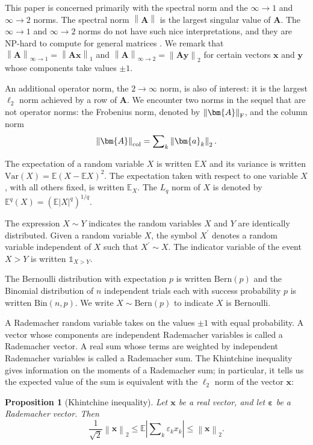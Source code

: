 \documentclass[11pt,letterpaper,twoside,reqno]{amsart}
\newcommand{\mat}[1]{\ensuremath{\bm{#1}}}
\newcommand{\E}{\ensuremath{\mathbb{E}}}
\newcommand{\norm}[1]{\ensuremath{\left\|#1\right\|}}
\newcommand{\infonorm}[1]{\ensuremath{\left\|#1\right\|_{\infty\rightarrow 1}}}
\newcommand{\inftnorm}[1]{\ensuremath{\left\|#1\right\|_{\infty\rightarrow 2}}}
\newcommand{\infone}{\ensuremath{\infty\!\rightarrow\!\!1}}
\newcommand{\inftwo}{\ensuremath{\infty\!\rightarrow\!\!2}}
\newcommand{\twoinf}{\ensuremath{2\!\!\rightarrow\!\!\infty}}
\newcommand{\colnorm}[1]{\ensuremath{\left\|#1\right\|_{\text{\rm col}}}}
\newcommand{\frobnorm}[1]{\ensuremath{\left\|#1\right\|_{\text{\rm F}}}}
\newcommand{\var}[1]{\ensuremath{\mathrm{Var}(#1)}}
\newtheorem{prop}{Proposition}
\begin{document}
This paper is concerned primarily with the spectral norm and the $\infone$ and $\inftwo$ norms. The spectral norm $\norm{\mat{A}}$ is the largest singular value of $\mat{A}$. The $\infone$ and $\inftwo$ norms do not have such nice interpretations, and they are {\sf NP}-hard to compute for general matrices \cite{Rohn00}. We remark that $\infonorm{\mat{A}}=\norm{\mat{A}\mat{x}}_{1}$ and $\inftnorm{\mat{A}}=\norm{\mat{A}\mat{y}}_{2}$ for certain vectors $\mat{x}$ and $\mat{y}$ whose components take values $\pm1$.

An additional operator norm, the $\twoinf$ norm, is also of interest: it is the largest $\ell_{2}$ norm achieved by a row of $\mat{A}$. We encounter two norms in the sequel that are not operator norms: the Frobenius norm, denoted by $\frobnorm{\mat{A}}$, and the column norm 
\[
\colnorm{\mat{A}}=\sum\nolimits_k\norm{\mat{a}_{k}}_{2}.
\]

The expectation of a random variable $X$ is written $\E X$ and its variance is written $\var{X} = \E(X-\E X)^2$. The expectation taken with respect to one variable $X$, with all others fixed, is written $\E_X$. The $L_q$ norm of $X$ is denoted by $\E^{q}(X)=(\E|X|^{q})^{1/q}.$ 

The expression $X \sim Y$ indicates the random variables $X$ and $Y$ are identically distributed. Given a random variable $X$, the symbol $X^\prime$ denotes a random variable independent of $X$ such that $X^\prime \sim X$. The indicator variable of the event $X > Y$ is written $\mathbb{1}_{X > Y}$.

The Bernoulli distribution with expectation $p$ is written $\text{Bern}(p)$ and the Binomial distribution of $n$ independent trials each with success probability $p$ is written $\text{Bin}(n,p)$. We write $X \sim \text{Bern}(p)$ to indicate $X$ is Bernoulli.

A Rademacher random variable takes on the values $\pm1$ with equal probability. A vector whose components are independent Rademacher variables is called a Rademacher vector. A real sum whose terms are weighted by independent Rademacher variables is called a Rademacher sum. The Khintchine inequality \cite{Szarek78} gives information on the moments of a Rademacher sum; in particular, it tells us the expected value of the sum is equivalent with the $\ell_2$ norm of the vector $\mat{x}$:

\begin{prop}[Khintchine inequality]
Let $\mat{x}$ be a real vector, and let $\boldsymbol{\varepsilon}$ be a Rademacher vector. Then 
\[
\frac{1}{\sqrt{2}}\norm{\mat{x}}_{2}\leq\E\left|\sum\nolimits_{k}\varepsilon_{k}x_{k}\right|\leq\norm{\mat{x}}_{2}.
\]
\end{prop}
\end{document}
